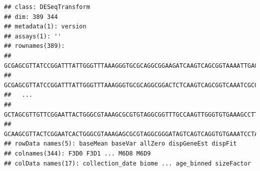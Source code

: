 \begin{knitrout}
\color{fgcolor}\begin{kframe}
\begin{alltt}
\hlstd{(}\hlstd{(}\hlstd{,} \hlstd{,} \hlstd{,} \hlstd{,} \hlstd{,}
                \hlstd{,} \hlstd{))}
 \hlkwb{<-}   \hlopt{~}  \hlopt{+} 
  \hlstd{=} \hlstd{,}  \hlstd{=} \hlstd{)}
\end{alltt}
\begin{verbatim}
## class: DESeqTransform 
## dim: 389 344 
## metadata(1): version
## assays(1): ''
## rownames(389):
##   GCGAGCGTTATCCGGATTTATTGGGTTTAAAGGGTGCGCAGGCGGAAGATCAAGTCAGCGGTAAAATTGAGAGGCTCAACCTCTTCGAGCCGTTGAAACTGGTTTTCTTGAGTGAGCGAGAAGTATGCGGAATGCGTGGTGTAGCGGTGAAATGCATAGATATCACGCAGAACTCCGATTGCGAAGGCAGCATACCGGCGCTCAACTGACGCTCATGCACGAAAGTGTGGGTATC
##   GCGAGCGTTATCCGGATTTATTGGGTTTAAAGGGTGCGCAGGCGGACTCTCAAGTCAGCGGTCAAATCGCGGGGCTCAACCCCGTTCCGCCGTTGAAACTGGGAGCCTTGAGTGCGCGAGAAGTAGGCGGAATGCGTGGTGTAGCGGTGAAATGCATAGATATCACGCAGAACTCCGATTGCGAAGGCAGCCTACCGGCGCGCAACTGACGCTCATGCACGAAAGCGTGGGTATC
##   ...
##   GCTAGCGTTGTTCGGAATTACTGGGCGTAAAGCGCGTGTAGGCGGTTTGCCAAGTTGGGTGTGAAAGCCTTGAGCTCAACTCAAGAAATGCACTCAGTACTGGCAGACTAGAGGACCGGAGAGGATAGTGGAATTCCCAGTGTAGTGGTGAAATACGTAGAGATTGGGAAGAACACCAGTGGCGAAGGCGGCTATCTGGACGGTTTCTGACGCTAAGACGCGAAAGCGTGGGGAG
##   GCAAGCGTTACTCGGAATCACTGGGCGTAAAGAGCGCGTAGGCGGGATAGTCAGTCAGGTGTGAAATCCTATGGCTTAACCATAGAACTGCATTTGAAACTACTATTCTAGAGTGTGGGAGAGGTAGGTGGAATTCTTGGTGTAGGGGTAAAATCCGTAGAGATCAAGAGGAATACTCATTGCGAAGGCGACCTGCTGGAACATTACTGACGCTGATTGCGCGAAAGCGTGGGGA
## rowData names(5): baseMean baseVar allZero dispGeneEst dispFit
## colnames(344): F3D0 F3D1 ... M6D8 M6D9
## colData names(17): collection_date biome ... age_binned sizeFactor
\end{verbatim}
\begin{alltt}
 \hlkwb{<-} 
 \hlkwb{<-} 
 \hlkwb{<-} 
\end{alltt}
\end{kframe}
\end{knitrout}

